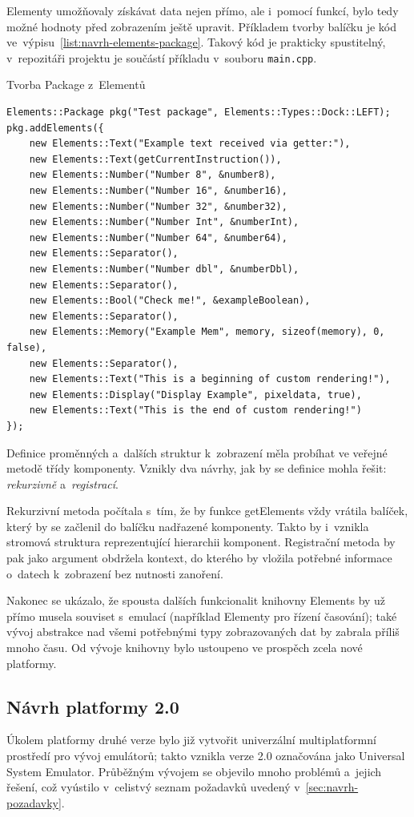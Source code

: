 Elementy umožňovaly získávat data nejen přímo, ale i~pomocí funkcí, bylo tedy možné hodnoty před zobrazením ještě upravit. Příkladem tvorby balíčku je kód ve~výpisu~\ref{list:navrh-elements-package}. Takový kód je prakticky spustitelný, v~repozitáři projektu je součástí příkladu v~souboru \texttt{main.cpp}.

\begin{listing}
	\caption{Tvorba Package z~Elementů}
	\label{list:navrh-elements-package}
	\begin{verbatim}
Elements::Package pkg("Test package", Elements::Types::Dock::LEFT);
pkg.addElements({
	new Elements::Text("Example text received via getter:"),
	new Elements::Text(getCurrentInstruction()),
	new Elements::Number("Number 8", &number8),
	new Elements::Number("Number 16", &number16),
	new Elements::Number("Number 32", &number32),
	new Elements::Number("Number Int", &numberInt),
	new Elements::Number("Number 64", &number64),
	new Elements::Separator(),
	new Elements::Number("Number dbl", &numberDbl),
	new Elements::Separator(),
	new Elements::Bool("Check me!", &exampleBoolean),
	new Elements::Separator(),
	new Elements::Memory("Example Mem", memory, sizeof(memory), 0, false),
	new Elements::Separator(),
	new Elements::Text("This is a beginning of custom rendering!"),
	new Elements::Display("Display Example", pixeldata, true),
	new Elements::Text("This is the end of custom rendering!")
});
	\end{verbatim}
\end{listing}

Definice proměnných a~dalších struktur k~zobrazení měla probíhat ve veřejné metodě třídy komponenty. Vznikly dva návrhy, jak by se definice mohla řešit: \emph{rekurzivně} a~\emph{registrací}.

Rekurzivní metoda počítala s~tím, že by funkce getElements vždy vrátila balíček, který by se začlenil do balíčku nadřazené komponenty. Takto by i~vznikla stromová struktura reprezentující hierarchii komponent. Registrační metoda by pak jako argument obdržela kontext, do kterého by vložila potřebné informace o~datech k~zobrazení bez nutnosti zanoření.

Nakonec se ukázalo, že spousta dalších funkcionalit knihovny Elements by už přímo musela souviset s~emulací (například Elementy pro řízení časování); také vývoj abstrakce nad všemi potřebnými typy zobrazovaných dat by zabrala příliš mnoho času. Od vývoje knihovny bylo ustoupeno ve prospěch zcela nové platformy.

\subsection{Návrh platformy 2.0}
Úkolem platformy druhé verze bylo již vytvořit univerzální multiplatformní prostředí pro vývoj emulátorů; takto vznikla verze 2.0 označována jako Universal System Emulator. Průběžným vývojem se objevilo mnoho problémů a~jejich řešení, což vyústilo v~celistvý seznam požadavků uvedený v~\ref{sec:navrh-pozadavky}.

